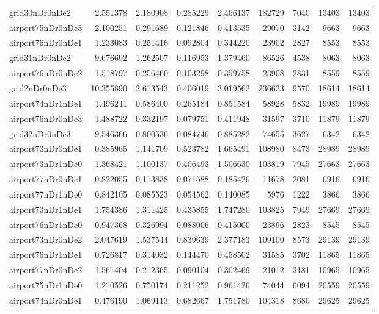 \begin{longtable}{|l|r|r|r|r|r|r|r|r|}
grid30nDr0nDe2 & 2.551378 & 2.180908 & 0.285229 & 2.466137 & 182729 & 7040 & 13403 & 13403 \\
airport75nDr0nDe3 & 2.100251 & 0.291689 & 0.121846 & 0.413535 & 29070 & 3142 & 9663 & 9663 \\
airport76nDr0nDe1 & 1.233083 & 0.251416 & 0.092804 & 0.344220 & 23902 & 2827 & 8553 & 8553 \\
grid31nDr0nDe2 & 9.676692 & 1.262507 & 0.116953 & 1.379460 & 86526 & 4538 & 8063 & 8063 \\
airport76nDr0nDe2 & 1.518797 & 0.256460 & 0.103298 & 0.359758 & 23908 & 2831 & 8559 & 8559 \\
grid2nDr0nDe3 & 10.355890 & 2.613543 & 0.406019 & 3.019562 & 236623 & 9570 & 18614 & 18614 \\
airport74nDr1nDe1 & 1.496241 & 0.586400 & 0.265184 & 0.851584 & 58928 & 5832 & 19989 & 19989 \\
airport76nDr0nDe3 & 1.488722 & 0.332197 & 0.079751 & 0.411948 & 31597 & 3710 & 11879 & 11879 \\
grid32nDr0nDe3 & 9.546366 & 0.800536 & 0.084746 & 0.885282 & 74655 & 3627 & 6342 & 6342 \\
airport73nDr0nDe1 & 0.385965 & 1.141709 & 0.523782 & 1.665491 & 108980 & 8473 & 28989 & 28989 \\
airport73nDr1nDe0 & 1.368421 & 1.100137 & 0.406493 & 1.506630 & 103819 & 7945 & 27663 & 27663 \\
airport77nDr0nDe1 & 0.822055 & 0.113838 & 0.071588 & 0.185426 & 11678 & 2081 & 6916 & 6916 \\
airport77nDr1nDe0 & 0.842105 & 0.085523 & 0.054562 & 0.140085 & 5976 & 1222 & 3866 & 3866 \\
airport73nDr1nDe1 & 1.754386 & 1.311425 & 0.435855 & 1.747280 & 103825 & 7949 & 27669 & 27669 \\
airport76nDr1nDe0 & 0.947368 & 0.326994 & 0.088006 & 0.415000 & 23896 & 2823 & 8545 & 8545 \\
airport73nDr0nDe2 & 2.047619 & 1.537544 & 0.839639 & 2.377183 & 109100 & 8573 & 29139 & 29139 \\
airport76nDr1nDe1 & 0.726817 & 0.314032 & 0.144470 & 0.458502 & 31585 & 3702 & 11865 & 11865 \\
airport77nDr0nDe2 & 1.561404 & 0.212365 & 0.090104 & 0.302469 & 21012 & 3181 & 10965 & 10965 \\
airport75nDr1nDe0 & 1.210526 & 0.750174 & 0.211252 & 0.961426 & 74044 & 6094 & 20559 & 20559 \\
airport74nDr0nDe1 & 0.476190 & 1.069113 & 0.682667 & 1.751780 & 104318 & 8680 & 29625 & 29625 \\

\end{longtable}

